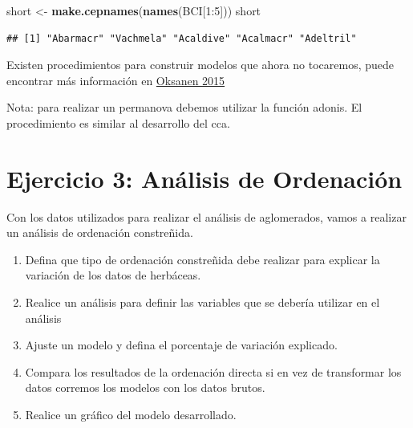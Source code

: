 \documentclass[]{book}
\newenvironment{Shaded}{\begin{snugshade}}{\end{snugshade}}
\newcommand{\KeywordTok}[1]{\textcolor[rgb]{0.13,0.29,0.53}{\textbf{{#1}}}}
\newcommand{\DecValTok}[1]{\textcolor[rgb]{0.00,0.00,0.81}{{#1}}}
\newcommand{\StringTok}[1]{\textcolor[rgb]{0.31,0.60,0.02}{{#1}}}
\newcommand{\NormalTok}[1]{{#1}}
\begin{document}
\begin{Shaded}
\begin{Highlighting}[]
\NormalTok{short <-}\StringTok{ }\KeywordTok{make.cepnames}\NormalTok{(}\KeywordTok{names}\NormalTok{(BCI[}\DecValTok{1}\NormalTok{:}\DecValTok{5}\NormalTok{]))}
\NormalTok{short}
\end{Highlighting}
\end{Shaded}

\begin{verbatim}
## [1] "Abarmacr" "Vachmela" "Acaldive" "Acalmacr" "Adeltril"
\end{verbatim}

Existen procedimientos para construir modelos que ahora no tocaremos,
puede encontrar más información en
\href{http://cc.oulu.fi/~jarioksa/opetus/metodi/vegantutor.pdf}{Oksanen
2015}

Nota: para realizar un permanova debemos utilizar la función adonis. El
procedimiento es similar al desarrollo del cca.

\section{Ejercicio 3: Análisis de
Ordenación}\label{ejercicio-3-analisis-de-ordenacion}

Con los datos utilizados para realizar el análisis de aglomerados, vamos
a realizar un análisis de ordenación constreñida.

\begin{enumerate}
\def\labelenumi{\alph{enumi}.}
\item
  Defina que tipo de ordenación constreñida debe realizar para explicar
  la variación de los datos de herbáceas.
\item
  Realice un análisis para definir las variables que se debería utilizar
  en el análisis
\item
  Ajuste un modelo y defina el porcentaje de variación explicado.
\item
  Compara los resultados de la ordenación directa si en vez de
  transformar los datos corremos los modelos con los datos brutos.
\item
  Realice un gráfico del modelo desarrollado.
\end{enumerate}


\end{document}
